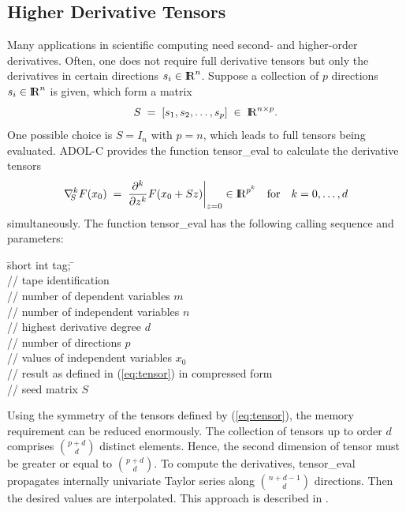 \documentclass[11pt,twoside]{article}
\newcommand{\R}{{ {\rm I} \kern -.225em {\rm R} }}
\begin{document}
\subsection{Higher Derivative Tensors}
\label{higherOrderDeriv}
%
Many applications in scientific computing need second- and higher-order
derivatives. Often, one does not require full derivative tensors but 
only the derivatives in certain directions $s_i \in \R^{n}$.
Suppose a collection of $p$ directions
$s_i \in \R^{n}$ is given, which form a matrix
\[
S\; =\; \left [ s_1, s_2,\ldots,  s_p \right ]\; \in \;
 \R^{n \times p}.
\]
One possible choice is $S = I_n$ with  $p = n$, which leads to
full tensors being evaluated. 
ADOL-C provides the function {\sf tensor\_eval}
to calculate the derivative tensors
\begin{eqnarray}
\label{eq:tensor}
\left. \nabla_{\mbox{$\scriptstyle \!\!S$}}^{k}
     F(x_0) \; = \; \frac{\partial^k}{\partial z^k} F(x_0+Sz) \right |_{z=0} 
     \in \R^{p^k}\quad \mbox{for} \quad k = 0,\ldots,d
\end{eqnarray}
simultaneously. The function {\sf tensor\_eval} has the following calling sequence and 
parameters:
%
\begin{tabbing}
\hspace{0.5in}\={\sf short int tag;} \hspace{1.1in}\= \kill    %
\\
         \> // tape identification \\
                 \> // number of dependent variables $m$ \\
                 \> // number of independent variables $n$\\
                 \> // highest derivative degree $d$\\
                 \> // number of directions $p$\\
           \> // values of independent variables $x_0$\\
\> // result as defined in (\ref{eq:tensor}) in compressed form\\
        \> // seed matrix $S$
\end{tabbing}
%
Using the symmetry of the tensors defined by (\ref{eq:tensor}), the memory  
requirement can be reduced enormously. The collection of  tensors up to order $d$ comprises  
$\binom{p+d}{d}$ distinct elements. Hence, the second dimension of {\sf tensor} must be 
greater or equal to $\binom{p+d}{d}$.
To compute the derivatives, {\sf tensor\_eval} propagates internally univariate Taylor 
series along $\binom{n+d-1}{d}$ directions. Then the desired values are interpolated. This
approach is described in \cite{Griewank97}.
\end{document}

